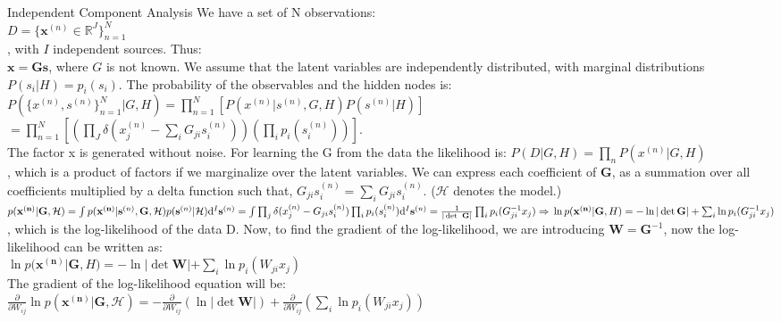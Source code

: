 \documentclass[a4paper,landscape]{amsmlaj}
\makeatletter
\renewcommand{\section}{\@startsection{section}{1}{0mm}
	{-0ex plus -.1ex minus -.5ex}
	{0.1ex plus .7ex}
	{\normalfont\large\bfseries}}
\makeatother
\begin{document}
\begin{multicols*}{3}
\section{Independent Component Analysis}
We have a set of N observations:\\
$D = \lbrace \mathbf{x}^{(n)} \in \mathbb{R}^J \rbrace ^{N}_{n=1}$\\
, with $I$ independent sources. Thus:\\
$\mathbf{x} = \mathbf{G}\mathbf{s}$, where $G$ is not known. We assume that the
latent variables are independently distributed, with marginal distributions
$P(s_i|H) = p_i(s_i)$. The probability of the observables and the hidden nodes
is:\\
$P(\lbrace x^{(n)},s^{(n)} \rbrace_{n=1}^{N}|G,H) =
\prod_{n=1}^N[P(x^{(n)}|s^{(n)},G,H)P(s^{(n)}|H)]$\\
$= \prod_{n=1}^N[(\prod_J \delta(x_j^{(n)} - \sum_i G_{ji}s_i^{(n)}))(\prod_i
p_i(s_i^{(n)}))]$.\\ The factor x is generated without noise. For learning the G
from the data the likelihood is: $P(D|G,H) = \prod_n P(x^{(n)}|G,H)$\\
, which is a product of factors if we marginalize over the latent variables. We
can express each coefficient of $\mathbf{G}$, as a summation over all
coefficients multiplied by a delta function such that, $G_{ji}s_i^{(n)} = \sum_i
G_{ji}s_i^{(n)}$. ($\mathcal{H}$ denotes the model.)\\
$
p(\mathbf{x^{(n)}} | \mathbf{G}, \mathcal{H}) = \int p(\mathbf{x^{(n)}} |
\mathbf{s}^{(n)}, \mathbf{G}, \mathcal{H}) p(\mathbf{s}^{(n)}| \mathcal{H})
\mathrm{d}^I\mathbf{s}^{(n)}\\
= \int \prod_j \delta (x_j^{(n)} - G_{ji}s_i^{(n)}) \prod_i
p_i(s_i^{(n)})\mathrm{d}^I\mathbf{s}^{(n)}\\
= \frac{1}{|\det\ \mathbf{G}|} \prod_i p_i(G_{ji}^{-1}x_j) \Rightarrow \\
\ln p(\mathbf{x^{(n)}} | \mathbf{G}, H) = -\ln |\det \mathbf{G}| + \sum_i \ln
p_i(G_{ji}^{-1}x_j)
$\\
, which is the log-likelihood of the data D. Now, to find the gradient of the
log-likelihood, we are introducing $\mathbf{W} = \mathbf{G}^{-1}$, now the
log-likelihood can be written as:\\
$
\ln p(\mathbf{x^{(n)}} | \mathbf{G}, H) = -\ln |\det\mathbf{W}| + \sum_i \ln
p_i(W_{ji}x_j)
$\\
The gradient of the log-likelihood equation will be:\\
$
\frac{\partial}{\partial W_{ij}}\ln p(\mathbf{x^{(n)}} | \mathbf{G},
\mathcal{H}) = -\frac{\partial}{\partial W_{ij}}(\ln|\det \mathbf{W}|) +
\frac{\partial}{\partial W_{ij}}(\sum_i \ln p_i(W_{ji}x_j))
$


\end{multicols*}
\end{document}
